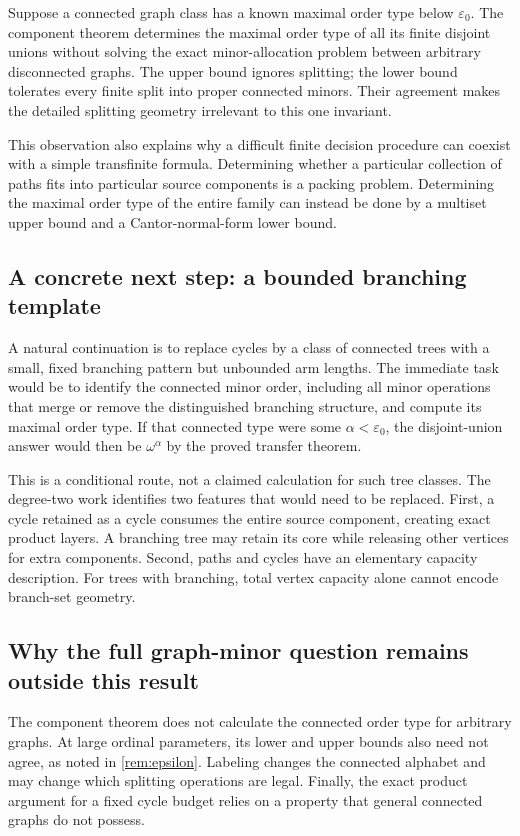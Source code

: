 \documentclass[11pt,letterpaper]{article}
\theoremstyle{plain}
\theoremstyle{definition}
\theoremstyle{remark}
\newcommand{\eps}{\varepsilon}
\begin{document}
Suppose a connected graph class has a known maximal order type
below $\eps_0$. The component theorem determines the maximal order
type of all its finite disjoint unions without solving the exact
minor-allocation problem between arbitrary disconnected graphs.
The upper bound ignores splitting; the lower bound tolerates every
finite split into proper connected minors. Their agreement makes
the detailed splitting geometry irrelevant to this one invariant.

This observation also explains why a difficult finite decision
procedure can coexist with a simple transfinite formula. Determining
whether a particular collection of paths fits into particular source
components is a packing problem. Determining the maximal order type
of the entire family can instead be done by a multiset upper bound
and a Cantor-normal-form lower bound.

\subsection{A concrete next step: a bounded branching template}

A natural continuation is to replace cycles by a class of connected
trees with a small, fixed branching pattern but unbounded arm lengths.
The immediate task would be to identify the connected minor order,
including all minor operations that merge or remove the distinguished
branching structure, and compute its maximal order type. If that
connected type were some $\alpha<\eps_0$, the disjoint-union answer
would then be $\omega^\alpha$ by the proved transfer theorem.

This is a conditional route, not a claimed calculation for such tree
classes. The degree-two work identifies two features that would need
to be replaced. First, a cycle retained as a cycle consumes the entire
source component, creating exact product layers. A branching tree
may retain its core while releasing other vertices for extra
components. Second, paths and cycles have an elementary capacity
description. For trees with branching, total vertex capacity alone
cannot encode branch-set geometry.

\subsection{Why the full graph-minor question remains outside this result}

The component theorem does not calculate the connected order type
for arbitrary graphs. At large ordinal parameters, its lower and
upper bounds also need not agree, as noted in
\cref{rem:epsilon}. Labeling changes the connected alphabet and may
change which splitting operations are legal. Finally, the exact
product argument for a fixed cycle budget relies on a property that
general connected graphs do not possess.
\end{document}
